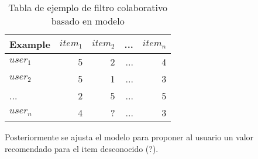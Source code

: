 \begin{table}[]
\centering
\caption{Tabla de ejemplo de filtro colaborativo basado en modelo}
\label{tab:1}
\begin{tabular}{ lrrrr }
\toprule
Example                & $item_{1}$ & $item_{2}$ & ... & $item_{n}$ \\ \midrule
$user_{1}$ & 5         & 2           & ...           & 4       \\ 
$user_{2}$ & 5         & 1            & ...           & 3       \\ 
... & 2        & 5           & ...           & 5       \\ 
$user_{n}$ & 4         & ?           & ...          & 3       \\ \bottomrule
\end{tabular}
\end{table}

Posteriormente se ajusta el modelo para proponer al usuario un valor recomendado para el item desconocido (?).
